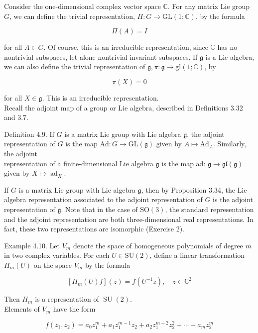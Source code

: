 \documentclass[10pt, letterpaper]{article}
\begin{document}
Consider the one-dimensional complex vector space $\mathbb{C}$. For any matrix Lie group $G$, we can define the trivial representation, $\Pi: G \rightarrow \mathrm{GL}(1 ; \mathbb{C})$, by the formula

$$
\Pi(A)=I
$$

for all $A \in G$. Of course, this is an irreducible representation, since $\mathbb{C}$ has no nontrivial subspaces, let alone nontrivial invariant subspaces. If $\mathfrak{g}$ is a Lie algebra, we can also define the trivial representation of $\mathfrak{g}, \pi: \mathfrak{g} \rightarrow \mathrm{gl}(1 ; \mathbb{C})$, by

$$
\pi(X)=0
$$

for all $X \in \mathfrak{g}$. This is an irreducible representation.\\
Recall the adjoint map of a group or Lie algebra, described in Definitions 3.32 and 3.7.

Definition 4.9. If $G$ is a matrix Lie group with Lie algebra $\mathfrak{g}$, the adjoint representation of $G$ is the map $\mathrm{Ad}: G \rightarrow \mathrm{GL}(\mathfrak{g})$ given by $A \mapsto \mathrm{Ad}_{A}$. Similarly, the adjoint\\
representation of a finite-dimensional Lie algebra $\mathfrak{g}$ is the map ad: $\mathfrak{g} \rightarrow \mathfrak{g l}(\mathfrak{g})$ given by $X \mapsto \operatorname{ad}_{X}$.

If $G$ is a matrix Lie group with Lie algebra $\mathfrak{g}$, then by Proposition 3.34, the Lie algebra representation associated to the adjoint representation of $G$ is the adjoint representation of $\mathfrak{g}$. Note that in the case of $\mathrm{SO}(3)$, the standard representation and the adjoint representation are both three-dimensional real representations. In fact, these two representations are isomorphic (Exercise 2).

Example 4.10. Let $V_{m}$ denote the space of homogeneous polynomials of degree $m$ in two complex variables. For each $U \in \mathrm{SU}(2)$, define a linear transformation $\Pi_{m}(U)$ on the space $V_{m}$ by the formula

$$
\left[\Pi_{m}(U) f\right](z)=f\left(U^{-1} z\right), \quad z \in \mathbb{C}^{2}
$$

Then $\Pi_{m}$ is a representation of $\operatorname{SU}(2)$.\\
Elements of $V_{m}$ have the form

$$
f\left(z_{1}, z_{2}\right)=a_{0} z_{1}^{m}+a_{1} z_{1}^{m-1} z_{2}+a_{2} z_{1}^{m-2} z_{2}^{2}+\cdots+a_{m} z_{2}^{m}
$$
\end{document}

